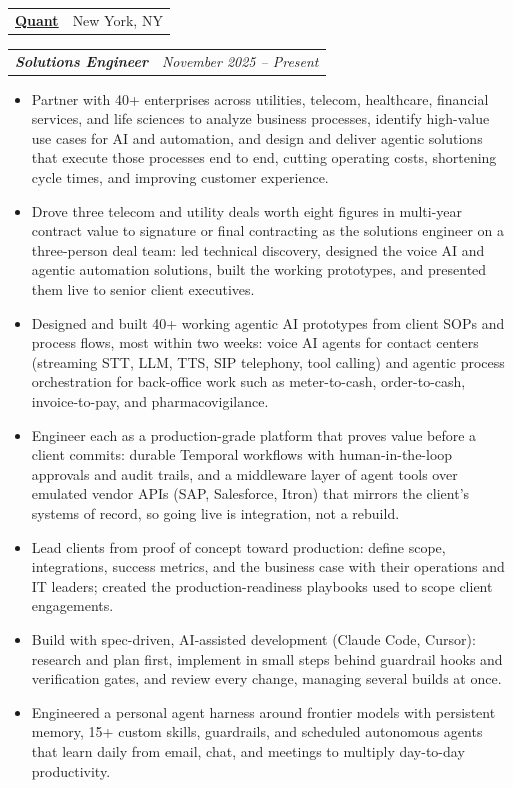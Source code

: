 \documentclass[letterpaper,11pt]{article}
\makeatletter
\newcommand{\resumeCompanyHeader}[2]{
  \vspace{-1pt}\item
    \begin{tabular*}{0.97\textwidth}{l@{\extracolsep{\fill}}r}
      \textbf{#1} & #2 \\
    \end{tabular*}\vspace{-5pt}
}
\newcommand{\resumeJobTitle}[2]{
  \vspace{-3pt}\item
    \begin{tabular*}{0.97\textwidth}{l@{\extracolsep{\fill}}r}
      \textit{\small\bfseries#1} & \textit{\small #2} \\
    \end{tabular*}\vspace{-5pt}
}
\newcommand{\resumeBullet}[1]{\item\small{#1}}
\newcommand{\resumeBulletStart}{ \begin{itemize}[leftmargin=1.1em, labelsep=0.45em, label={\small\textbullet}, itemsep=0pt, before={\linespread{0.9}\selectfont}] }
\newcommand{\resumeBulletEnd}{\end{itemize}}
\makeatother
\begin{document}
    \resumeCompanyHeader{\href{https://quant.ai}{Quant}}{New York, NY}
    \resumeJobTitle{Solutions Engineer}{November 2025 -- Present}
    \resumeBulletStart
      \resumeBullet
      {Partner with 40+ enterprises across utilities, telecom, healthcare, financial services, and life sciences to analyze business processes, identify high-value use cases for AI and automation, and design and deliver agentic solutions that execute those processes end to end, cutting operating costs, shortening cycle times, and improving customer experience.}
      \resumeBullet
      {Drove three telecom and utility deals worth eight figures in multi-year contract value to signature or final contracting as the solutions engineer on a three-person deal team: led technical discovery, designed the voice AI and agentic automation solutions, built the working prototypes, and presented them live to senior client executives.}
      \resumeBullet
      {Designed and built 40+ working agentic AI prototypes from client SOPs and process flows, most within two weeks: voice AI agents for contact centers (streaming STT, LLM, TTS, SIP telephony, tool calling) and agentic process orchestration for back-office work such as meter-to-cash, order-to-cash, invoice-to-pay, and pharmacovigilance.}
      \resumeBullet
      {Engineer each as a production-grade platform that proves value before a client commits: durable Temporal workflows with human-in-the-loop approvals and audit trails, and a middleware layer of agent tools over emulated vendor APIs (SAP, Salesforce, Itron) that mirrors the client's systems of record, so going live is integration, not a rebuild.}
      \resumeBullet
      {Lead clients from proof of concept toward production: define scope, integrations, success metrics, and the business case with their operations and IT leaders; created the production-readiness playbooks used to scope client engagements.}
      \resumeBullet
      {Build with spec-driven, AI-assisted development (Claude Code, Cursor): research and plan first, implement in small steps behind guardrail hooks and verification gates, and review every change, managing several builds at once.}
      \resumeBullet
      {Engineered a personal agent harness around frontier models with persistent memory, 15+ custom skills, guardrails, and scheduled autonomous agents that learn daily from email, chat, and meetings to multiply day-to-day productivity.}
    \resumeBulletEnd
\end{document}
